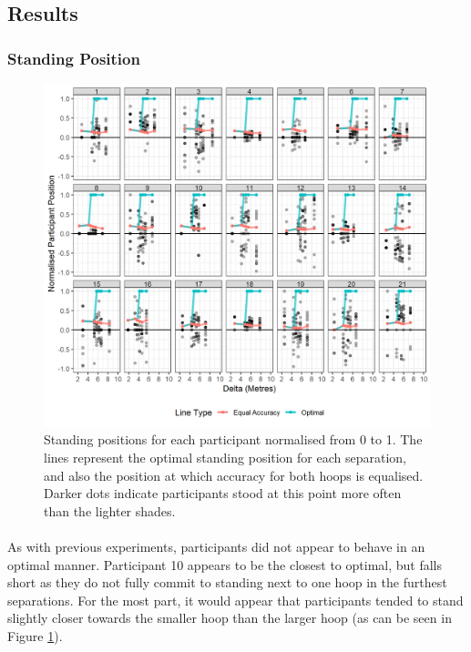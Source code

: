 \documentclass[12pt]{article}
\begin{document}
\subsection*{Results}

\subsubsection*{Standing Position}
\begin{figure}[ht!]
	\includegraphics[scale=0.9]{Figures/Experiment_3_Hoop_size/Session_2_plot}
	\centering
	\captionsetup{justification=centering}
	\caption{Standing positions for each participant normalised from 0 to 1. The lines represent the optimal standing position for each separation, and also the position at which accuracy for both hoops is equalised. Darker dots indicate participants stood at this point more often than the lighter shades.}
	\vspace{-0.5cm}
	\label{fig:Session2-HoopSizes}
\end{figure}

\paragraph{} As with previous experiments, participants did not appear to behave in an optimal manner. Participant 10 appears to be the closest to optimal, but falls short as they do not fully commit to standing next to one hoop in the furthest separations. For the most part, it would appear that participants tended to stand slightly closer towards the smaller hoop than the larger hoop (as can be seen in Figure \ref{fig:Session2-HoopSizes}).
\end{document}
